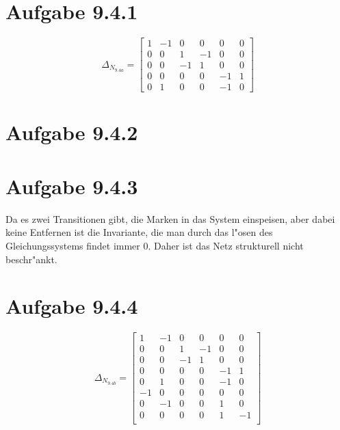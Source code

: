 \documentclass{article}
\begin{document}
\section*{Aufgabe 9.4.1}
\[
\Delta_{N_{9.4a}} =
\begin{bmatrix}
1   &	-1  &	0   &	0   &	0   &	0 \\
0   &	0   &	1   &	-1  &	0   &	0 \\
0   &	0   &	-1  &	1   &	0   &	0 \\
0   &	0   &	0   &	0   &	-1  &	1 \\
0   &	1   &	0   &	0   &	-1  &	0
\end{bmatrix}
\]

\section*{Aufgabe 9.4.2}

\section*{Aufgabe 9.4.3}
Da es zwei Transitionen gibt, die Marken in das System einspeisen, aber dabei
keine Entfernen ist die Invariante, die man durch das l"osen des
Gleichungssystems findet immer 0. Daher ist das Netz strukturell nicht
beschr"ankt.

\section*{Aufgabe 9.4.4}
\[
\Delta_{N_{9.4b}} =
\begin{bmatrix}
1   &	-1  &	0   &	0   &	0   &	0 \\
0   &	0   &	1   &	-1  &	0   &	0 \\
0   &	0   &	-1  &	1   &	0   &	0 \\
0   &	0   &	0   &	0   &	-1  &	1 \\
0   &	1   &	0   &	0   &	-1  &	0 \\
-1  &	0   &	0   &	0   &	0   &	0 \\
0   &	-1  &	0   &	0   &	1   &   0 \\
0   &	0   &	0   &	0   &	1   &   -1\\
\end{bmatrix}
\]
\end{document}
